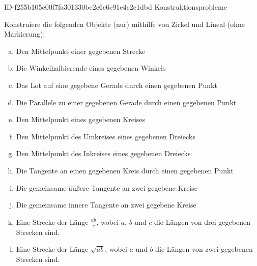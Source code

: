 \begin{exercise}
      {ID-f255b105c00f7fa301330be2c6c6c91e4c2e1dbd}
      {Konstruktionsprobleme}
  \ifproblem\problem\par
    Konstruiere die folgenden Objekte (nur) mithilfe von Zirkel und Lineal (ohne Markierung):
    \begin{enumerate}[a)]
      \item Den Mittelpunkt einer gegebenen Strecke
      \item Die Winkelhalbierende eines gegebenen Winkels
      \item Das Lot auf eine gegebene Gerade durch einen gegebenen Punkt
      \item Die Parallele zu einer gegebenen Gerade durch einen gegebenen Punkt
      \item Den Mittelpunkt eines gegebenen Kreises
      \item Den Mittelpunkt des Umkreises eines gegebenen Dreiecks
      \item Den Mittelpunkt des Inkreises eines gegebenen Dreiecks
      \item Die Tangente an einen gegebenen Kreis durch einen gegebenen Punkt
      \item Die gemeinsame äußere Tangente an zwei gegebene Kreise
      \item Die gemeinsame innere Tangente an zwei gegebene Kreise
      \item Eine Strecke der Länge $\frac{ab}{c}$, wobei $a$, $b$ und $c$
            die Längen von drei gegebenen Strecken sind.
      \item Eine Strecke der Länge $\sqrt{ab}$, wobei $a$ und $b$
            die Längen von zwei gegebenen Strecken sind.
    \end{enumerate}
  \fi
\end{exercise}
